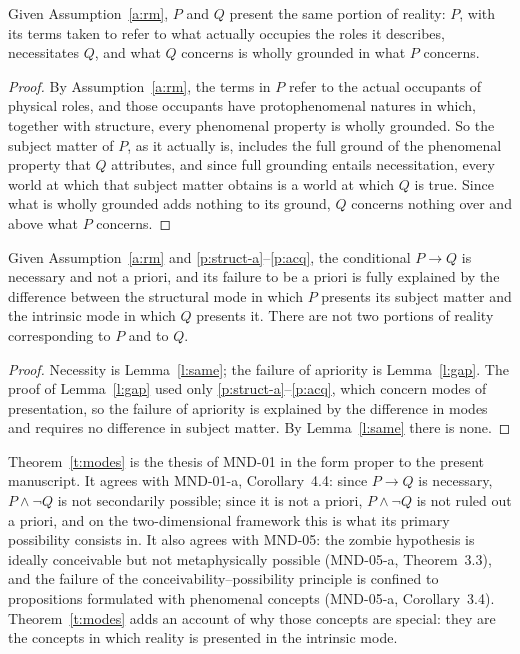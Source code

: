 \documentclass{situationist-preprint}
\begin{document}
\begin{lemma}\label{l:same}
Given Assumption~\ref{a:rm}, $P$ and $Q$ present the same portion of reality: $P$, with its terms taken to refer to what actually occupies the roles it describes, necessitates $Q$, and what $Q$ concerns is wholly grounded in what $P$ concerns.
\end{lemma}

\begin{proof}
By Assumption~\ref{a:rm}, the terms in $P$ refer to the actual occupants of physical roles, and those occupants have protophenomenal natures in which, together with structure, every phenomenal property is wholly grounded. So the subject matter of $P$, as it actually is, includes the full ground of the phenomenal property that $Q$ attributes, and since full grounding entails necessitation, every world at which that subject matter obtains is a world at which $Q$ is true. Since what is wholly grounded adds nothing to its ground, $Q$ concerns nothing over and above what $P$ concerns.
\end{proof}

\begin{theorem}\label{t:modes}
Given Assumption~\ref{a:rm} and \ref{p:struct-a}--\ref{p:acq}, the conditional $P \to Q$ is necessary and not a priori, and its failure to be a priori is fully explained by the difference between the structural mode in which $P$ presents its subject matter and the intrinsic mode in which $Q$ presents it. There are not two portions of reality corresponding to $P$ and to $Q$.
\end{theorem}

\begin{proof}
Necessity is Lemma~\ref{l:same}; the failure of apriority is Lemma~\ref{l:gap}. The proof of Lemma~\ref{l:gap} used only \ref{p:struct-a}--\ref{p:acq}, which concern modes of presentation, so the failure of apriority is explained by the difference in modes and requires no difference in subject matter. By Lemma~\ref{l:same} there is none.
\end{proof}

Theorem~\ref{t:modes} is the thesis of MND-01 in the form proper to the present manuscript. It agrees with MND-01-a, Corollary~4.4: since $P \to Q$ is necessary, $P \wedge \neg Q$ is not secondarily possible; since it is not a priori, $P \wedge \neg Q$ is not ruled out a priori, and on the two-dimensional framework this is what its primary possibility consists in. It also agrees with MND-05: the zombie hypothesis is ideally conceivable but not metaphysically possible (MND-05-a, Theorem~3.3), and the failure of the conceivability--possibility principle is confined to propositions formulated with phenomenal concepts (MND-05-a, Corollary~3.4). Theorem~\ref{t:modes} adds an account of why those concepts are special: they are the concepts in which reality is presented in the intrinsic mode.
\end{document}
